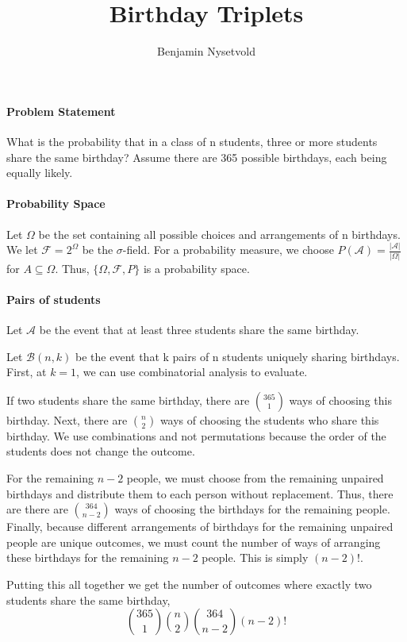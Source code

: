 \documentclass[12pt, letterpaper]{book}
\title{Birthday Triplets}
\author{Benjamin Nysetvold}
\begin{document}
	
	\paragraph{Problem Statement}
	What is the probability that in a class of n students, three or more students share the same birthday? Assume there are 365 possible birthdays, each being equally likely.
	
	\paragraph{Probability Space}
	Let \(\Omega\) be the set containing all possible choices and arrangements of n birthdays. We let \(\mathcal{F} = 2^{\Omega}\) be the \(\sigma\)-field. For a probability measure, we choose \(P(\mathcal{A}) = \frac{|\mathcal{A}|}{|\Omega|}\) for \(A \subseteq \Omega\). Thus, \(\{\Omega,\mathcal{F},P\}\) is a probability space.
	
	\paragraph{Pairs of students}
	Let \(\mathcal{A}\) be the event that at least three students share the same birthday.
	
	Let \(\mathcal{B}(n, k)\) be the event that k pairs of n students uniquely sharing birthdays. First, at \(k=1\), we can use combinatorial analysis to evaluate.
	
	If two students share the same birthday, there are \(\binom{365}{1}\) ways of choosing this birthday. Next, there are \(\binom{n}{2}\) ways of choosing the students who share this birthday. We use combinations and not permutations because the order of the students does not change the outcome.
	
	For the remaining \(n-2\) people, we must choose from the remaining unpaired birthdays and distribute them to each person without replacement. Thus, there are there are \(\binom{364}{n-2}\) ways of choosing the birthdays for the remaining people. Finally, because different arrangements of birthdays for the remaining unpaired people are unique outcomes, we must count the number of ways of arranging these birthdays for the remaining \(n-2\) people. This is simply \(\left(n-2\right)!\).
	
	Putting this all together we get the number of outcomes where exactly two students share the same birthday,
	\begin{equation}
		\binom{365}{1}\binom{n}{2}\binom{364}{n-2}\left(n-2\right)!
	\end{equation}
	
\end{document}
